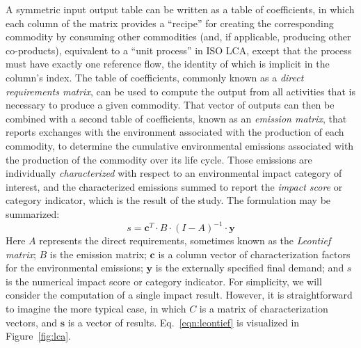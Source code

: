 A symmetric input output table can be written as a table of coefficients, in which each column of the matrix provides a ``recipe'' for creating the corresponding commodity by consuming other commodities (and, if applicable, producing other co-products), equivalent to a ``unit process'' in ISO LCA, except that the process must have exactly one reference flow, the identity of which is implicit in the column's index.  The table of coefficients, commonly known as a \textit{direct requirements matrix}, can be used to compute the output from all activities that is necessary to produce a given commodity.  That vector of outputs can then be combined with a second table of coefficients, known as an \textit{emission matrix}, that reports exchanges with the environment associated with the production of each commodity, to determine the cumulative environmental emissions associated with the production of the commodity over its life cycle.  Those emissions are individually \textit{characterized} with respect to an environmental impact category of interest, and the characterized emissions summed to report the \textit{impact score} or category indicator, which is the result of the study.  The formulation may be summarized:
\begin{equation}
s = \mathbf{c}^T \cdot B \cdot \left(I - A\right)^{-1} \cdot \mathbf{y}
\label{eqn:leontief}
\end{equation}
Here $A$ represents the direct requirements, sometimes known as the \textit{Leontief matrix}; $B$ is the emission matrix;  $\mathbf{c}$ is a column vector of characterization factors for the environmental emissions; $\mathbf{y}$ is the externally specified final demand; and $s$ is the numerical impact score or category indicator.  For simplicity, we will consider the computation of a single impact result.  However, it is straightforward to imagine the more typical case, in which $C$ is a matrix of characterization vectors, and $\mathbf{s}$ is a vector of results.  Eq.~\ref{eqn:leontief} is visualized in Figure~\ref{fig:lca}.


